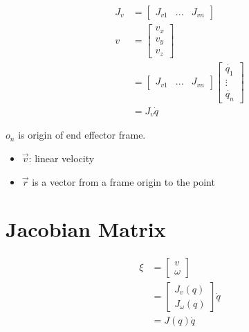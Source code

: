     \begin{align}
      J_{v}
        &=
        \begin{bmatrix}
          J_{v1} & ... & J_{vn}
        \end{bmatrix} \\
      v &=
        \begin{bmatrix}
          v_{x} \\
          v_{y} \\
          v_{z}
        \end{bmatrix} \\
        &=
        \begin{bmatrix}
          J_{v1} & ... & J_{vn}
        \end{bmatrix}
        \begin{bmatrix}
          \dot{q_{1}} \\
          \vdots \\
          \dot{q_{n}}
        \end{bmatrix} \\
        &= J_{v} \dot{q}
    \end{align}

    $ o_{n} $ is origin of end effector frame.

    \begin{itemize}
      \item $ \vec{v} $: linear velocity
      \item $ \vec{r} $ is a vector from a frame origin to the point
    \end{itemize}

\section{Jacobian Matrix}

  \begin{align}
    \xi
      &=
      \begin{bmatrix}
        v \\
        \omega
      \end{bmatrix} \\
      &=
      \begin{bmatrix}
        J_{v} \left( q \right) \\
        J_{\omega} \left( q \right)
      \end{bmatrix}
      \dot{q} \\
      &= J\left( q \right) \dot{q}
  \end{align}

